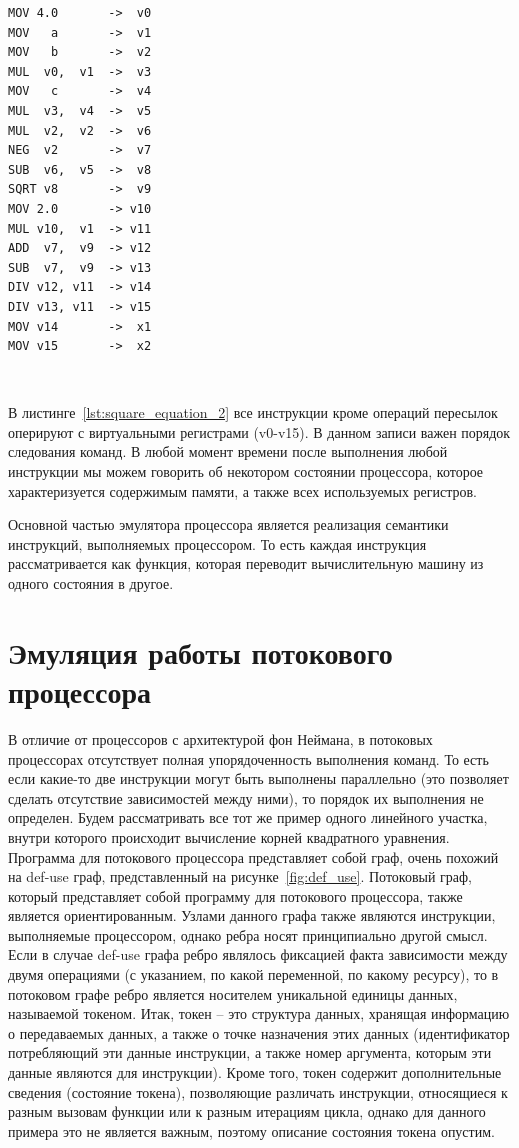 \documentclass[
11pt,%
tightenlines,%
twoside,%
onecolumn,%
nofloats,%
nobibnotes,%
nofootinbib,%
superscriptaddress,%
noshowpacs,%
centertags]%
{revtex4}
\begin{document}
\begin{lstlisting}[caption={Псевдокод вычисления корней квадратного уравнения.},label={lst:square_equation_2}]
MOV 4.0       ->  v0
MOV   a       ->  v1
MOV   b       ->  v2
MUL  v0,  v1  ->  v3
MOV   c       ->  v4
MUL  v3,  v4  ->  v5
MUL  v2,  v2  ->  v6
NEG  v2       ->  v7
SUB  v6,  v5  ->  v8
SQRT v8       ->  v9
MOV 2.0       -> v10
MUL v10,  v1  -> v11
ADD  v7,  v9  -> v12
SUB  v7,  v9  -> v13
DIV v12, v11  -> v14
DIV v13, v11  -> v15
MOV v14       ->  x1
MOV v15       ->  x2
\end{lstlisting}

\

В листинге~\ref{lst:square_equation_2} все инструкции кроме операций пересылок оперируют с виртуальными регистрами (v0-v15).
В данном записи важен порядок следования команд.
В любой момент времени после выполнения любой инструкции мы можем говорить об некотором состоянии процессора, которое характеризуется содержимым памяти, а также всех используемых регистров.

Основной частью эмулятора процессора является реализация семантики инструкций, выполняемых процессором.
То есть каждая инструкция рассматривается как функция, которая переводит вычислительную машину из одного состояния в другое.

\section{Эмуляция работы потокового процессора}

В отличие от процессоров с архитектурой фон Неймана, в потоковых процессорах отсутствует полная упорядоченность выполнения команд.
То есть если какие-то две инструкции могут быть выполнены параллельно (это позволяет сделать отсутствие зависимостей между ними), то порядок их выполнения не определен.
Будем рассматривать все тот же пример одного линейного участка, внутри которого происходит вычисление корней квадратного уравнения.
Программа для потокового процессора представляет собой граф, очень похожий на def-use граф, представленный на рисунке~\ref{fig:def_use}.
Потоковый граф, который представляет собой программу для потокового процессора, также является ориентированным.
Узлами данного графа также являются инструкции, выполняемые процессором, однако ребра носят принципиально другой смысл.
Если в случае def-use графа ребро являлось фиксацией факта зависимости между двумя операциями (с указанием, по какой переменной, по какому ресурсу), то в потоковом графе ребро является носителем уникальной единицы данных, называемой токеном.
Итак, токен -- это структура данных, хранящая информацию о передаваемых данных, а также о точке назначения этих данных (идентификатор потребляющий эти данные инструкции, а также номер аргумента, которым эти данные являются для инструкции).
Кроме того, токен содержит дополнительные сведения (состояние токена), позволяющие различать инструкции, относящиеся к разным вызовам функции или к разным итерациям цикла, однако для данного примера это не является важным, поэтому описание состояния токена опустим.
\end{document}
